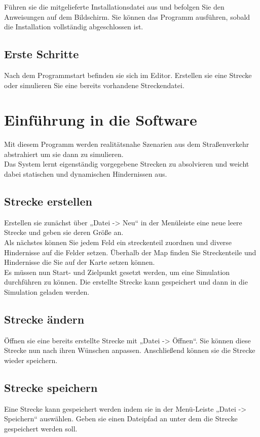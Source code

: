 \documentclass[11pt,a4paper]{article}
\begin{document}
Führen sie die mitgelieferte Installationsdatei aus und befolgen Sie den Anweisungen auf dem Bildschirm. Sie können das Programm ausführen, sobald die Installation vollständig abgeschlossen ist.

\subsection{Erste Schritte}

Nach dem Programmstart befinden sie sich im Editor. Erstellen sie eine Strecke oder simulieren Sie eine bereits vorhandene Streckendatei.

\newpage
\section{Einführung in die Software}
Mit diesem Programm werden realitätsnahe Szenarien aus dem Straßenverkehr abstrahiert um sie dann zu simulieren. \\
Das System lernt eigenständig vorgegebene Strecken zu absolvieren und weicht dabei statischen und dynamischen Hindernissen aus.

\subsection{Strecke erstellen}
Erstellen sie zunächst über „Datei -> Neu“ in der Menüleiste eine neue leere Strecke und geben sie deren Größe an. \\
Als nächstes können Sie jedem Feld ein streckenteil zuordnen und diverse Hindernisse auf die Felder setzen.
Überhalb der Map finden Sie Streckenteile und Hindernisse die Sie auf der Karte setzen können.\\
Es müssen nun Start- und Zielpunkt gesetzt werden, um eine Simulation durchführen zu können. Die erstellte Strecke kann gespeichert und dann in die Simulation geladen werden. \\

\subsection{Strecke ändern}
Öffnen sie eine bereits erstellte Strecke mit „Datei -> Öffnen“. Sie können diese Strecke nun nach ihren Wünschen anpassen. 
Anschließend können sie die Strecke wieder speichern.
\newpage
\subsection{Strecke speichern}
Eine Strecke kann gespeichert werden indem sie in der Menü-Leiste „Datei -> Speichern“ auswählen. Geben sie einen Dateipfad an unter dem die Strecke gespeichert werden soll.
\end{document}
